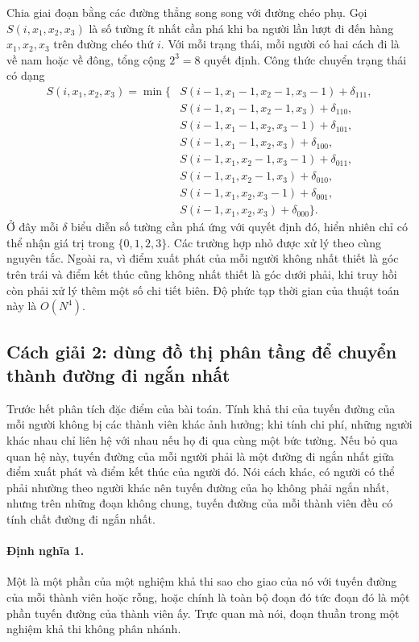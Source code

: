 \documentclass[11pt]{article}
\begin{document}
Chia giai đoạn bằng các đường thẳng song song với đường chéo phụ. Gọi
$S(i,x_1,x_2,x_3)$ là số tường ít nhất cần phá khi ba người lần lượt đi đến
hàng $x_1,x_2,x_3$ trên đường chéo thứ $i$. Với mỗi trạng thái, mỗi người có
hai cách đi là về nam hoặc về đông, tổng cộng $2^3=8$ quyết định. Công thức
chuyển trạng thái có dạng
\[
\begin{aligned}
S(i,x_1,x_2,x_3)=\min\{&
S(i-1,x_1-1,x_2-1,x_3-1)+\delta_{111},\\
&S(i-1,x_1-1,x_2-1,x_3)+\delta_{110},\\
&S(i-1,x_1-1,x_2,x_3-1)+\delta_{101},\\
&S(i-1,x_1-1,x_2,x_3)+\delta_{100},\\
&S(i-1,x_1,x_2-1,x_3-1)+\delta_{011},\\
&S(i-1,x_1,x_2-1,x_3)+\delta_{010},\\
&S(i-1,x_1,x_2,x_3-1)+\delta_{001},\\
&S(i-1,x_1,x_2,x_3)+\delta_{000}\}.
\end{aligned}
\]
Ở đây mỗi $\delta$ biểu diễn số tường cần phá ứng với quyết định đó, hiển
nhiên chỉ có thể nhận giá trị trong $\{0,1,2,3\}$. Các trường hợp nhỏ được xử
lý theo cùng nguyên tắc. Ngoài ra, vì điểm xuất phát của mỗi người không
nhất thiết là góc trên trái và điểm kết thúc cũng không nhất thiết là góc dưới
phải, khi truy hồi còn phải xử lý thêm một số chi tiết biên. Độ phức tạp thời
gian của thuật toán này là $O(N^4)$.

\subsection{Cách giải 2: dùng đồ thị phân tầng để chuyển thành đường đi ngắn nhất}

Trước hết phân tích đặc điểm của bài toán. Tính khả thi của tuyến đường của
mỗi người không bị các thành viên khác ảnh hưởng; khi tính chi phí, những
người khác nhau chỉ liên hệ với nhau nếu họ đi qua cùng một bức tường. Nếu bỏ
qua quan hệ này, tuyến đường của mỗi người phải là một đường đi ngắn nhất giữa
điểm xuất phát và điểm kết thúc của người đó. Nói cách khác, có người có thể
phải nhường theo người khác nên tuyến đường của họ không phải ngắn nhất,
nhưng trên những đoạn không chung, tuyến đường của mỗi thành viên đều có tính
chất đường đi ngắn nhất.

\paragraph{Định nghĩa 1.}
Một  là một phần của một nghiệm khả thi sao cho giao của nó
với tuyến đường của mỗi thành viên hoặc rỗng, hoặc chính là toàn bộ đoạn đó
tức đoạn đó là một phần tuyến đường của thành viên ấy. Trực quan mà nói, đoạn
thuần trong một nghiệm khả thi không phân nhánh.
\end{document}
